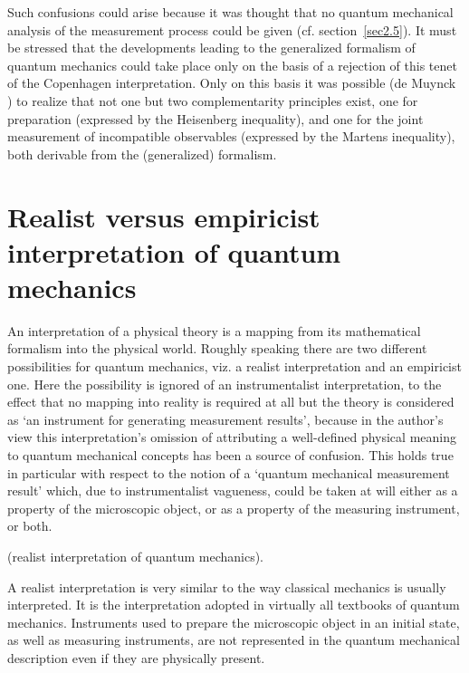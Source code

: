 \documentclass[12pt]{article}
\begin{document}
Such confusions could arise because it was thought that no quantum
mechanical analysis of the measurement process could be given (cf.
section~\ref{sec2.5}). It must be stressed that the developments
leading to the generalized formalism of quantum mechanics could
take place only on the basis of a rejection of this tenet of the
Copenhagen interpretation. Only on this basis it was possible (de
Muynck \cite{dM2000}) to realize that not one but two
complementarity principles exist, one for preparation (expressed
by the Heisenberg inequality), and one for the joint measurement
of incompatible observables (expressed by the Martens inequality),
both derivable from the (generalized) formalism.

\section{Realist versus empiricist interpretation of quantum
mechanics}\label{sec3} An interpretation of a physical theory is a
mapping from its mathematical formalism into the physical world.
Roughly speaking there are two different possibilities for quantum
mechanics, viz. a realist interpretation and an empiricist one.
Here the possibility is ignored of an instrumentalist
interpretation, to the effect that no mapping into reality is
required at all but the theory is considered as `an instrument for
generating measurement results', because in the author's view this
interpretation's omission of attributing a well-defined physical
meaning to quantum mechanical concepts has been a source of
confusion. This holds true in particular with respect to the
notion of a `quantum mechanical measurement result' which, due to
instrumentalist vagueness, could be taken at will either as a
property of the microscopic object, or as a property of the
measuring instrument, or both.

\medskip
{} (realist
interpretation of quantum mechanics).
\medskip

\noindent A realist interpretation is very similar to the way
classical mechanics is usually interpreted. It is the
interpretation adopted in virtually all textbooks of quantum
mechanics. Instruments used to prepare the microscopic object in
an initial state, as well as measuring instruments, are not
represented in the quantum mechanical description even if they are
physically present.
\end{document}
